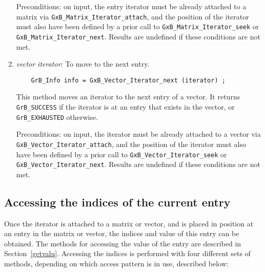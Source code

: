 \documentclass[12pt]{article}
\begin{document}
\begin{enumerate}
    Preconditions: on input, the entry iterator must be already attached to a
    matrix via \verb'GxB_Matrix_Iterator_attach', and the position of the
    iterator must also have been defined by a prior call to
    \verb'GxB_Matrix_Iterator_seek' or \verb'GxB_Matrix_Iterator_next'.
    Results are undefined if these conditions are not met.

    \item {\em vector iterator}: To move to the next entry.
    {\footnotesize
    \begin{verbatim}
    GrB_Info info = GxB_Vector_Iterator_next (iterator) ; \end{verbatim}}

    This method moves an iterator to the next entry of a vector.
    It returns \verb'GrB_SUCCESS' if the iterator is at an entry that
    exists in the vector, or \verb'GrB_EXHAUSTED' otherwise.

    Preconditions: on input, the iterator must be already attached to a
    vector via \verb'GxB_Vector_Iterator_attach', and the position of the
    iterator must also have been defined by a prior call to
    \verb'GxB_Vector_Iterator_seek' or \verb'GxB_Vector_Iterator_next'.
    Results are undefined if these conditions are not met.

    \end{enumerate}

\subsection{Accessing the indices of the current entry}

Once the iterator is attached to a matrix or vector, and is placed in position
at an entry in the matrix or vector, the indices and value of this entry can be
obtained.  The methods for accessing the value of the entry are described in
Section~\ref{getvalu}.  Accessing the indices is performed with four different
sets of methods, depending on which access pattern is in use, described below:
\end{document}
